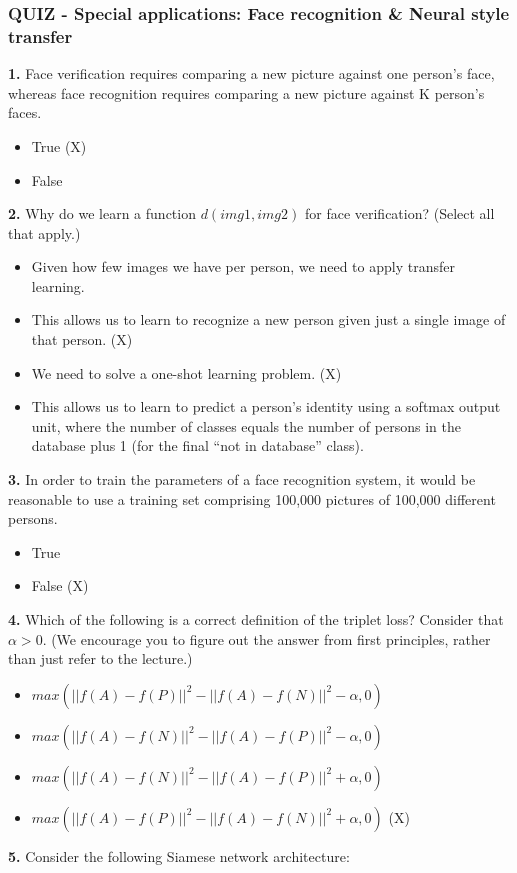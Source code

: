 \subsubsection{QUIZ - Special applications: Face recognition \& Neural style transfer}
\textbf{1.} Face verification requires comparing a new picture against one person’s face, whereas face recognition requires comparing a new picture against K person’s faces.
\begin{itemize}
    \item True (X)
    \item False
\end{itemize}
\textbf{2.} Why do we learn a function $d(img1, img2)$ for face verification? (Select all that apply.)
\begin{itemize}
    \item Given how few images we have per person, we need to apply transfer learning.
    \item This allows us to learn to recognize a new person given just a single image of that person. (X)
    \item We need to solve a one-shot learning problem. (X)
    \item This allows us to learn to predict a person’s identity using a softmax output unit, where the number of classes equals the number of persons in the database plus 1 (for the final “not in database” class).
\end{itemize}
\textbf{3.} In order to train the parameters of a face recognition system, it would be reasonable to use a training set comprising 100,000 pictures of 100,000 different persons.
\begin{itemize}
    \item True
    \item False (X)
\end{itemize}
\textbf{4.} Which of the following is a correct definition of the triplet loss? Consider that $\alpha > 0$. (We encourage you to figure out the answer from first principles, rather than just refer to the lecture.)
\begin{itemize}
    \item $max(\left|\left| f(A) - f(P) \right|\right|^2 - \left|\left| f(A) - f(N) \right|\right|^2 - \alpha, 0)$
    \item $max(\left|\left| f(A) - f(N) \right|\right|^2 - \left|\left| f(A) - f(P) \right|\right|^2 - \alpha, 0)$
    \item $max(\left|\left| f(A) - f(N) \right|\right|^2 - \left|\left| f(A) - f(P) \right|\right|^2 + \alpha, 0)$
    \item $max(\left|\left| f(A) - f(P) \right|\right|^2 - \left|\left| f(A) - f(N) \right|\right|^2 + \alpha,0)$ (X)
\end{itemize}
\textbf{5.} Consider the following Siamese network architecture:

